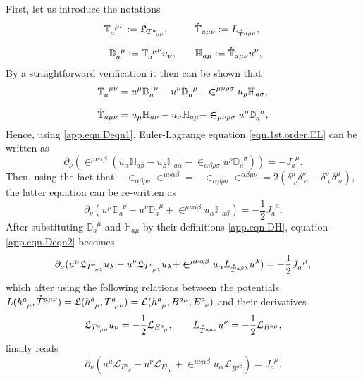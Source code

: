 \documentclass[
10pt, %
a4paper, %
oneside, %
headinclude,footinclude, %
BCOR5mm, %
]{scrartcl}
\newcommand{\tetrsymbol}{h}
\newcommand{\tetr}[2]{\tetrsymbol^{#1}_{\phantom{#1}#2}}
\newcommand{\D}[1]{\partial_{#1}} %
\newcommand{\Tors}[2]{T^{#1}_{\phantom{a}#2}}
\newcommand{\ET}[2]{E^{#1}_{\phantom{#1}#2}}	%
\newcommand{\BT}[2]{B^{#1#2}}	%
\newcommand{\Laghodge}{L}%
\newcommand{\Lagtors}{\mathfrak{L}}%
\newcommand{\LagBE}{\mathcal{L}}%
\newcommand{\LCsymb}{\bm{\in}}    %
\newcommand{\HDT}[1]{\accentset{\star}{T}^{#1}}
\newcommand{\KD}[2]{\delta^{#1}_{\,\,#2}}
\newcommand{\NC}[2]{J^{\phantom{#1}#2}_{#1}}
\newcommand{\TorsConj}[2]{\mathbb{T}_{#1}^{\phantom{#1}#2}}
\newcommand{\HTConj}[1]{\accentset{\star}{\mathbb{T}}_{#1}}
\newcommand{\Dbb}[2]{\mathbb{D}_{#1}^{\phantom{#1}#2}}
\newcommand{\Hbb}[2]{\mathbb{H}_{#1#2}}
\begin{document}
First, let us introduce the notations
\begin{subequations}
	\begin{align}
			\TorsConj{a}{\mu\nu} := \Lagtors_{\Tors{a}{\mu\nu}},\hspace{1cm}
			&\HTConj{a\mu\nu} := \Laghodge_{\HDT{a\mu\nu}}, 
			\\[2mm]
			\Dbb{a}{\mu} := \TorsConj{a}{\mu\nu}u_\nu, \qquad
			&\Hbb{a}{\mu} := \HTConj{a\mu\nu}u^\nu,\label{app.eqn.DH}
	\end{align}
\end{subequations}
By a straightforward verification it then can be shown that
\begin{subequations}
	\begin{align}
	\TorsConj{a}{\mu\nu} &= u^\mu \Dbb{a}{\nu} - u^\nu \Dbb{a}{\mu} +
	\LCsymb^{\mu\nu\rho\sigma}u_\rho \Hbb{a}{\sigma},\\[2mm]
	\HTConj{a\mu\nu} &= u_\mu \Hbb{a}{\nu} - u_\nu \Hbb{a}{\mu} - 
	\LCsymb_{\mu\nu\rho\sigma}u^\rho \Dbb{a}{\sigma}\label{app.eqn.Deqn1},
	\end{align}
\end{subequations}
Hence, using \eqref{app.eqn.Deqn1}, Euler-Lagrange equation \eqref{eqn.1st.order.EL} can be written 
as
\begin{equation}
\D{\nu}(\LCsymb^{\mu\nu\alpha\beta}(u_\alpha \Hbb{a}{\beta} - u_\beta \Hbb{a}{\alpha} - 
\LCsymb_{\alpha\beta\rho\sigma}u^\rho \Dbb{a}{\sigma})) = -\NC{a}{\mu}.
\end{equation}
Then, using the fact that $ -\LCsymb_{\alpha\beta\rho\sigma}\LCsymb^{\mu\nu\alpha\beta} = 
-\LCsymb_{\alpha\beta\rho\sigma}\LCsymb^{\alpha\beta\mu\nu} = 2(\KD{\mu}{\rho}\KD{\nu}{\sigma} - 
\KD{\nu}{\rho}\KD{\mu}{\sigma})$, the latter equation can be re-written as
\begin{equation}\label{app.eqn.Deqn2}
	\D{\nu}(u^\mu \Dbb{a}{\nu} - u^\nu \Dbb{a}{\mu} + \LCsymb^{\mu\nu\alpha\beta}
	u_\alpha\Hbb{a}{\beta}) = -\frac12\NC{a}{\mu}.
\end{equation}
After substituting $ \Dbb{a}{\mu} $ and $ \Hbb{a}{\mu} $ by their definitions \eqref{app.eqn.DH}, 
equation \eqref{app.eqn.Deqn2} becomes
\begin{equation}
	\D{\nu}(u^\mu \Lagtors_{\Tors{a}{\nu\lambda}}u_\lambda - u^\nu \Lagtors_{\Tors{a}{\mu\lambda}} 
	u_\lambda + \LCsymb^{\mu\nu\alpha\beta}u_\alpha \Laghodge_{\HDT{a\beta\lambda}}u^\lambda) = 
	-\frac12 \NC{a}{\mu},
\end{equation}
which after using the following relations between the potentials $ 
\Laghodge(\tetr{a}{\mu},\HDT{a\mu\nu}) = 
\Lagtors(\tetr{a}{\mu},\Tors{a}{\mu\nu}) = 
\LagBE(\tetr{a}{\mu},\BT{a}{\mu},\ET{a}{\nu}) $ and their derivatives
\begin{equation}
	\Lagtors_{\Tors{a}{\mu\nu}} u_\nu = -\frac12\LagBE_{\ET{a}{\mu}},
	\qquad
	\Laghodge_{\HDT{a\mu\nu}} u^\nu= -\frac12\LagBE_{\BT{a}{\mu}},
\end{equation}
finally reads
\begin{equation}
	\D{\nu}( u^\mu\LagBE_{\ET{a}{\nu}} - u^\nu \LagBE_{\ET{a}{\mu}} + 
	\LCsymb^{\mu\nu\alpha
	\beta}u_\alpha\LagBE_{\BT{a}{\beta}}) 
	= \NC{a}{\mu}.
\end{equation}

\printbibliography
\end{document}
